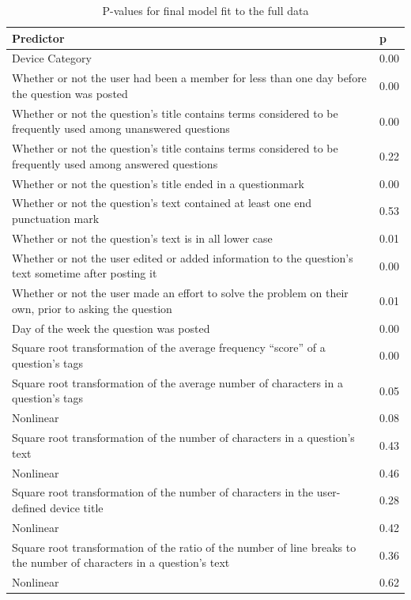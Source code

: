 \documentclass{article}
\begin{document}
\begin{table}[ht]
\centering
\caption{P-values for final model fit to the full data} 
\begin{tabular}{|p{12cm}|p{1cm}|}
  \hline
Predictor & p \\ 
  \hline \hline
Device Category & 0.00 \\ 
  \hline
Whether or not the user had been a member for less than one day before the question was posted & 0.00 \\ 
  \hline
Whether or not the question's title contains terms considered to be frequently used among unanswered questions & 0.00 \\
  \hline
Whether or not the question's title contains terms considered to be frequently used among answered questions & 0.22 \\ 
  \hline
Whether or not the question's title ended in a questionmark & 0.00 \\ 
  \hline
Whether or not the question's text contained at least one end punctuation mark & 0.53 \\ 
  \hline
Whether or not the question's text is in all lower case & 0.01 \\ 
  \hline
Whether or not the user edited or added information to the question's text sometime after posting it & 0.00 \\ 
  \hline
Whether or not the user made an effort to solve the problem on their own, prior to asking the question & 0.01 \\ 
  \hline
Day of the week the question was posted & 0.00 \\ 
  \hline
Square root transformation of the average frequency ``score'' of a question's tags & 0.00 \\ 
  \hline
Square root transformation of the average number of characters in a question's tags & 0.05 \\ 
Nonlinear & 0.08 \\ 
  \hline
Square root transformation of the number of characters in a question's text & 0.43 \\ 
Nonlinear & 0.46 \\ 
  \hline
Square root transformation of the number of characters in the user-defined device title & 0.28 \\ 
Nonlinear & 0.42 \\ 
  \hline
Square root transformation of the ratio of the number of line breaks to the number of characters in a question's text & 0.36 \\ 
Nonlinear & 0.62 \\ 
   \hline
\end{tabular}
\label{table:pvalues}
\end{table}
\end{document}

